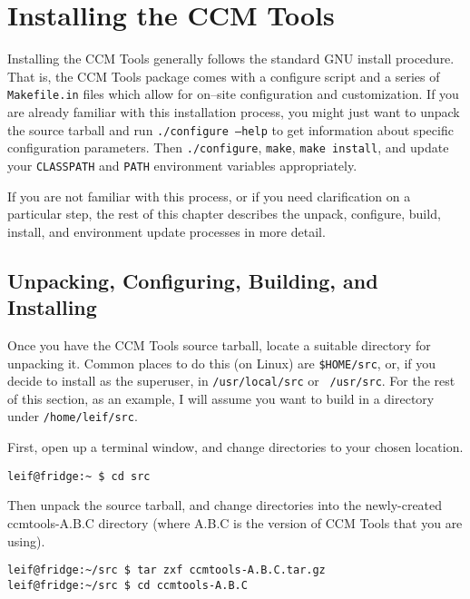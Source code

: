 \chapter{Installing the CCM Tools}

Installing the CCM Tools generally follows the standard GNU install procedure.
That is, the CCM Tools package comes with a configure script and a series of
{\tt Makefile.in} files which allow for on--site configuration and
customization. If you are already familiar with this installation process, you
might just want to unpack the source tarball and run {\tt ./configure --help} to
get information about specific configuration parameters. Then {\tt ./configure},
{\tt make}, {\tt make install}, and update your {\tt CLASSPATH} and {\tt PATH}
environment variables appropriately.

If you are not familiar with this process, or if you need clarification on a
particular step, the rest of this chapter describes the unpack, configure,
build, install, and environment update processes in more detail.

\section{Unpacking, Configuring, Building, and Installing}

Once you have the CCM Tools source tarball, locate a suitable directory for
unpacking it. Common places to do this (on Linux) are {\tt \$HOME/src}, or, if
you decide to install as the superuser, in {\tt /usr/local/src} or {\tt
/usr/src}. For the rest of this section, as an example, I will assume you want
to build in a directory under {\tt /home/leif/src}.

First, open up a terminal window, and change directories to your chosen
location.
\begin{verbatim}
leif@fridge:~ $ cd src
\end{verbatim}
Then unpack the source tarball, and change directories into the newly-created
ccmtools-A.B.C directory (where A.B.C is the version of CCM Tools that you are
using).
\begin{verbatim}
leif@fridge:~/src $ tar zxf ccmtools-A.B.C.tar.gz
leif@fridge:~/src $ cd ccmtools-A.B.C
\end{verbatim}

